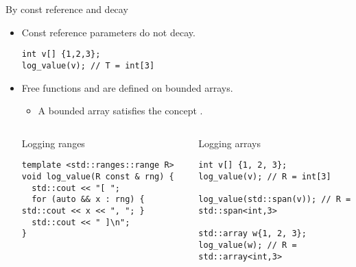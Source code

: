 \begin{frame}[t,fragile]{By const reference and decay}
\begin{itemize}
  \item Const reference parameters do not decay.
\begin{lstlisting}
int v[] {1,2,3};
log_value(v); // T = int[3]
\end{lstlisting}

  \item Free functions  and  are defined on
        bounded arrays.
    \begin{itemize}
      \item A bounded array satisfies the concept .
    \end{itemize}

\begin{columns}[T]

\begin{block}{Logging ranges}
\begin{lstlisting}
template <std::ranges::range R>
void log_value(R const & rng) {
  std::cout << "[ ";
  for (auto && x : rng) { std::cout << x << ", "; }
  std::cout << " ]\n";
}
\end{lstlisting}
\end{block}

\begin{block}{Logging arrays}
\begin{lstlisting}
int v[] {1, 2, 3};
log_value(v); // R = int[3]

log_value(std::span(v)); // R = std::span<int,3>

std::array w{1, 2, 3};
log_value(w); // R = std::array<int,3>
\end{lstlisting}
\end{block}

\end{columns}
\end{itemize}
\end{frame}


